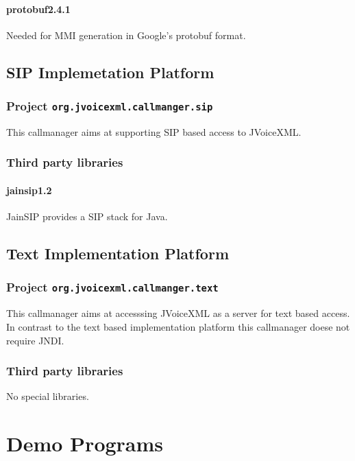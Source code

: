 \documentclass[11pt,a4paper]{article}
\begin{document}
\paragraph{protobuf2.4.1}

Needed for MMI generation in Google's protobuf format.

\subsection{SIP Implemetation Platform}
\subsubsection{Project \texttt{org.jvoicexml.callmanger.sip}}

This callmanager aims at supporting SIP based access to JVoiceXML.

\subsubsection{Third party libraries}

\paragraph{jainsip1.2}

JainSIP provides a SIP stack for Java.

\subsection{Text Implementation Platform}
\subsubsection{Project \texttt{org.jvoicexml.callmanger.text}}

This callmanager aims at accesssing JVoiceXML as a server for text based
access. In contrast to the text based implementation platform this callmanager
doese not require JNDI.

\subsubsection{Third party libraries}

No special libraries.



\section{Demo Programs}
\end{document}
